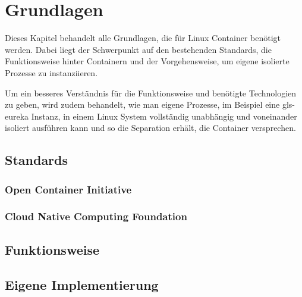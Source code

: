 \chapter{Grundlagen}
\label{chap:grundlagen}
Dieses Kapitel behandelt alle Grundlagen, die für Linux Container benötigt werden. Dabei liegt der Schwerpunkt auf den bestehenden Standards, die Funktionsweise hinter Containern und der Vorgehensweise, um eigene isolierte Prozesse zu instanziieren.

Um ein besseres Verständnis für die Funktionsweise und benötigte Technologien zu geben, wird zudem behandelt, wie man eigene Prozesse, im Beispiel eine \gls{gls-eureka} Instanz, in einem Linux System vollständig unabhängig und voneinander isoliert ausführen kann und so die Separation erhält, die Container versprechen.

\section{Standards}
\label{sec:standards}

\subsection{Open Container Initiative}
\label{sec:oci}

\subsection{Cloud Native Computing Foundation}
\label{sec:cncf}

\section{Funktionsweise}
\label{sec:funktionsweise}

\section{Eigene Implementierung}
\label{sec:eigeneImpl}